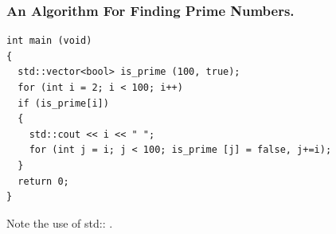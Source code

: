 \documentclass[compress]{beamer}
\begin{document}
\begin{frame}[fragile]
	\frametitle{An Algorithm For Finding Prime Numbers.}
	\begin{verbatim}
int main (void)
{
  std::vector<bool> is_prime (100, true);
  for (int i = 2; i < 100; i++)
  if (is_prime[i])
  {
    std::cout << i << " ";
    for (int j = i; j < 100; is_prime [j] = false, j+=i);
  }
  return 0;
}
    \end{verbatim}
		Note the use of \alert{std::} .
\end{frame}
\end{document}
